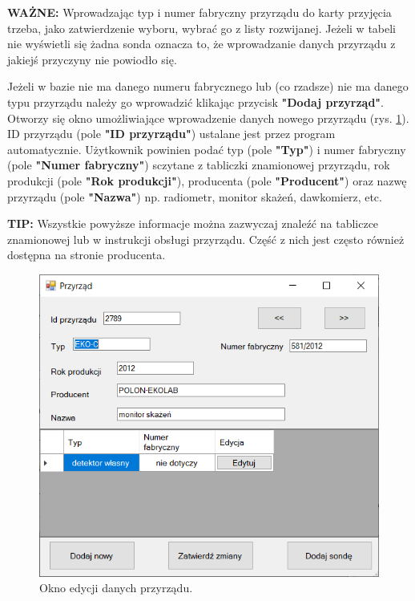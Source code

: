 \textbf{WAŻNE:} Wprowadzając typ i numer fabryczny przyrządu do karty przyjęcia trzeba, jako zatwierdzenie wyboru, wybrać go z listy rozwijanej. Jeżeli w tabeli nie wyświetli się żadna sonda oznacza to, że wprowadzanie danych przyrządu z jakiejś przyczyny nie powiodło się.

Jeżeli w bazie nie ma danego numeru fabrycznego lub (co rzadsze) nie ma danego typu przyrządu należy go wprowadzić klikając przycisk \textbf{"Dodaj przyrząd"}. Otworzy się okno umożliwiające wprowadzenie danych nowego przyrządu (rys. \ref{edytujPrzyrzad}). ID przyrządu  (pole \textbf{"ID przyrządu"}) ustalane jest przez program automatycznie. Użytkownik powinien podać typ (pole \textbf{"Typ"}) i numer fabryczny (pole \textbf{"Numer fabryczny"}) sczytane z tabliczki znamionowej przyrządu, rok produkcji (pole \textbf{"Rok produkcji"}), producenta (pole \textbf{"Producent"}) oraz nazwę przyrządu (pole \textbf{"Nazwa"}) np. radiometr, monitor skażeń, dawkomierz, etc.

\textbf{TIP:} Wszystkie powyższe informacje można zazwyczaj znaleźć na tabliczce znamionowej lub w instrukcji obsługi przyrządu. Część z nich jest często również dostępna na stronie producenta.

\begin{figure}[htb]
	\centering
	\includegraphics{obrazki/Biuro/karta/edytuj_przyrzad.png}
	\caption{Okno edycji danych przyrządu.}
	\label{edytujPrzyrzad}
\end{figure}

